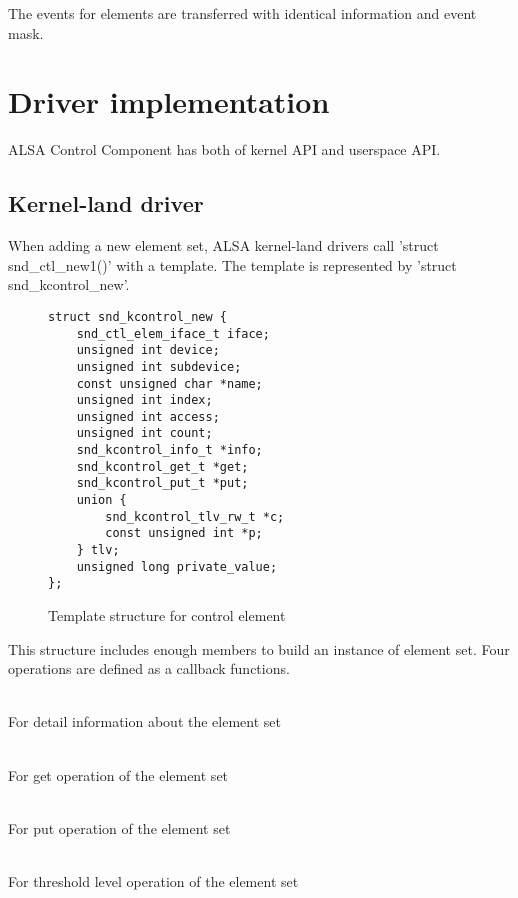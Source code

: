 \documentclass[onecolumn]{article}
\begin{document}
The events for elements are transferred with identical information and event mask.


\section{Driver implementation}

ALSA Control Component has both of kernel API and userspace API.

\subsection{Kernel-land driver}

When adding a new element set, ALSA kernel-land drivers call 'struct snd\_ctl\_new1()' with a template. The template is represented by 'struct snd\_kcontrol\_new'.

\begin{figure}[htbp]
\small
\begin{verbatim}
struct snd_kcontrol_new {
    snd_ctl_elem_iface_t iface;
    unsigned int device;
    unsigned int subdevice;
    const unsigned char *name;
    unsigned int index;
    unsigned int access;
    unsigned int count;
    snd_kcontrol_info_t *info;
    snd_kcontrol_get_t *get;
    snd_kcontrol_put_t *put;
    union {
        snd_kcontrol_tlv_rw_t *c;
        const unsigned int *p;
    } tlv;
    unsigned long private_value;
};
\end{verbatim}
\caption{{Template structure for control element}}
\label{control-element-template}
\end{figure}

This structure includes enough members to build an instance of element set. Four operations are defined as a callback functions.

\begin{description}
\small
\item[snd\_kcontrol\_info\_t] \mbox{} \\
For detail information about the element set
\item[snd\_kcontrol\_get\_t] \mbox{} \\
For get operation of the element set
\item[snd\_kcontrol\_put\_t] \mbox{} \\
For put operation of the element set
\item[snd\_kctl\_tlv\_rw\_t] \mbox{} \\
For threshold level operation of the element set
\end{description}
\end{document}
